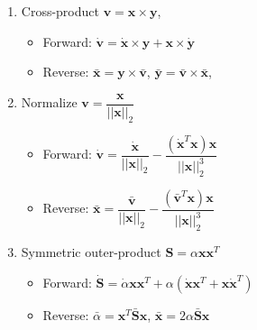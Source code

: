 \documentclass{article}
\begin{document}
\begin{enumerate}
\item Cross-product $\mathbf{v} = \mathbf{x} \times \mathbf{y}$,
\begin{itemize}
\item Forward: $\dot{\mathbf{v}} = \dot{\mathbf{x}} \times \mathbf{y} + \mathbf{x} \times \dot{\mathbf{y}}$
\item Reverse: $\bar{\mathbf{x}} = \mathbf{y} \times \bar{\mathbf{v}}$, $\bar{\mathbf{y}} = \bar{\mathbf{v}} \times \bar{\mathbf{x}}$,
\end{itemize}

\item Normalize $\mathbf{v} = \dfrac{\mathbf{x}}{||\mathbf{x}||_{2}}$
\begin{itemize}
\item Forward: $\dot{\mathbf{v}} = \dfrac{\dot{\mathbf{x}}}{||\mathbf{x}||_{2}} - \dfrac{(\dot{\mathbf{x}}^{T} \mathbf{x}) \mathbf{x}}{||\mathbf{x}||_{2}^{3}}$
\item Reverse: $\bar{\mathbf{x}} = \dfrac{\bar{\mathbf{v}}}{||\mathbf{x}||_{2}} - \dfrac{(\bar{\mathbf{v}}^{T} \mathbf{x}) \mathbf{x}}{||\mathbf{x}||_{2}^{3}}$
\end{itemize}

\item Symmetric outer-product $\mathbf{S} = \alpha \mathbf{x}\mathbf{x}^{T}$
\begin{itemize}
\item Forward: $\dot{\mathbf{S}} = \dot{\alpha}  \mathbf{x}\mathbf{x}^{T} + \alpha( \dot{\mathbf{x}} \mathbf{x}^{T} + \mathbf{x} \dot{\mathbf{x}}^{T})$
\item Reverse: $\bar{\alpha} = \mathbf{x}^{T} \bar{\mathbf{S}} \mathbf{x}$, $\bar{\mathbf{x}} = 2 \alpha \bar{\mathbf{S}} \mathbf{x}$
\end{itemize}



\end{enumerate}
\end{document}
